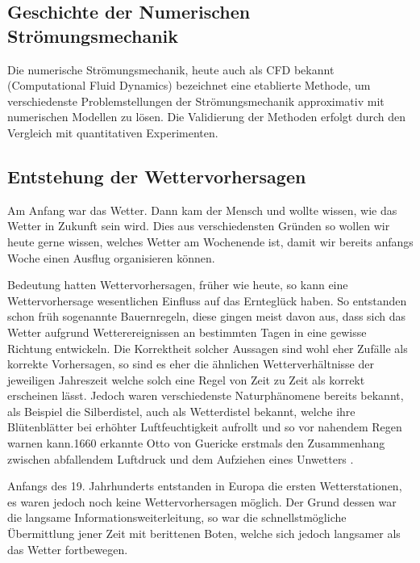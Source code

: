 \begin{refsection}
\section{Geschichte der Numerischen Strömungsmechanik
\label{klima:section:geschichte}}
Die numerische Strömungsmechanik, heute auch als CFD bekannt
(Computational Fluid Dynamics)
%
bezeichnet eine etablierte Methode, um verschiedenste
Problemstellungen der Strömungsmechanik approximativ mit numerischen
Modellen zu lösen. Die Validierung der Methoden erfolgt durch den
Vergleich mit quantitativen Experimenten.

\subsection{Entstehung der Wettervorhersagen
\label{klima:subsection:wetter}}
%
Am Anfang war das Wetter. Dann kam der Mensch und wollte wissen,
wie das Wetter in Zukunft sein wird. Dies aus verschiedensten Gründen
so wollen wir heute gerne wissen, welches Wetter am Wochenende ist,
damit wir bereits anfangs Woche einen Ausflug organisieren können.

Bedeutung hatten Wettervorhersagen, früher wie heute, so kann eine
Wettervorhersage wesentlichen Einfluss auf das Ernteglück haben.
So entstanden schon früh sogenannte Bauernregeln, diese gingen meist
davon aus, dass sich das Wetter aufgrund Wetterereignissen an
bestimmten Tagen in eine gewisse Richtung entwickeln. Die Korrektheit
solcher Aussagen sind wohl eher Zufälle als korrekte Vorhersagen,
so sind es eher die ähnlichen Wetterverhältnisse der jeweiligen
Jahreszeit welche solch eine Regel von Zeit zu Zeit als korrekt
erscheinen lässt. Jedoch waren verschiedenste Naturphänomene bereits
bekannt, als Beispiel die Silberdistel,
%
auch als Wetterdistel
%
bekannt, welche ihre Blütenblätter
bei erhöhter Luftfeuchtigkeit aufrollt und so vor nahendem Regen
warnen kann.1660 erkannte Otto von Guericke erstmals den Zusammenhang
zwischen abfallendem Luftdruck und dem Aufziehen eines Unwetters
\cite{klima:dwd}.

Anfangs des 19. Jahrhunderts entstanden in Europa die ersten
Wetterstationen,
%
es waren jedoch noch keine
Wettervorhersagen möglich. Der Grund dessen war die langsame
Informationsweiterleitung, so war die schnellstmögliche Übermittlung
jener Zeit mit berittenen Boten, welche sich jedoch langsamer als
das Wetter fortbewegen.


\end{refsection}
